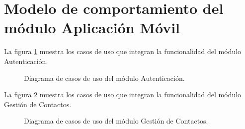 \section{Modelo de comportamiento del módulo Aplicación Móvil}

La figura \ref{fig:casosUso:Aute} muestra los casos de uso que integran la funcionalidad del módulo Autenticación.

\begin{figure}[htpb!]
	\begin{center}
		\caption{Diagrama de casos de uso del módulo Autenticación. \label{fig:casosUso:Aute}}
	\end{center}
\end{figure}


La figura \ref{fig:casosUso:Contacto} muestra los casos de uso que integran la funcionalidad del módulo Gestión de Contactos.

\begin{figure}[htpb!]
	\begin{center}
		\caption{Diagrama de casos de uso del módulo Gestión de Contactos. \label{fig:casosUso:Contacto}}
	\end{center}
\end{figure}


